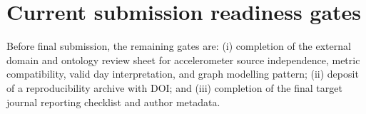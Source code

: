 \documentclass[final,5p,times,twocolumn]{elsarticle}
\begin{document}
\section{Current submission readiness gates}
\label{app:gates}

Before final submission, the remaining gates are: (i) completion of the external domain and ontology review sheet for accelerometer source independence, metric compatibility, valid day interpretation, and graph modelling pattern; (ii) deposit of a reproducibility archive with DOI; and (iii) completion of the final target journal reporting checklist and author metadata.



\end{document}
